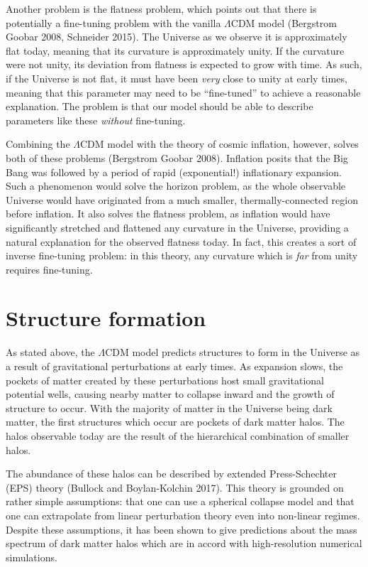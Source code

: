 Another problem is the flatness problem, which points out that there is
potentially a fine-tuning problem with the vanilla \(\Lambda\)CDM model
(Bergstrom Goobar 2008, Schneider 2015). The Universe as we observe it
is approximately flat today, meaning that its curvature is approximately
unity. If the curvature were not unity, its deviation from flatness is
expected to grow with time. As such, if the Universe is not flat, it
must have been \emph{very} close to unity at early times, meaning that
this parameter may need to be ``fine-tuned'' to achieve a reasonable
explanation. The problem is that our model should be able to describe
parameters like these \emph{without} fine-tuning.

Combining the \(\Lambda\)CDM model with the theory of cosmic inflation,
however, solves both of these problems (Bergstrom Goobar 2008).
Inflation posits that the Big Bang was followed by a period of rapid
(exponential!) inflationary expansion. Such a phenomenon would solve the
horizon problem, as the whole observable Universe would have originated
from a much smaller, thermally-connected region before inflation. It
also solves the flatness problem, as inflation would have significantly
stretched and flattened any curvature in the Universe, providing a
natural explanation for the observed flatness today. In fact, this
creates a sort of inverse fine-tuning problem: in this theory, any
curvature which is \emph{far} from unity requires fine-tuning.

\hypertarget{structure-formation}{%
\section{Structure formation}\label{structure-formation}}

As stated above, the \(\Lambda\)CDM model predicts structures to form in
the Universe as a result of gravitational perturbations at early times.
As expansion slows, the pockets of matter created by these perturbations
host small gravitational potential wells, causing nearby matter to
collapse inward and the growth of structure to occur. With the majority
of matter in the Universe being dark matter, the first structures which
occur are pockets of dark matter halos. The halos observable today are
the result of the hierarchical combination of smaller halos.

The abundance of these halos can be described by extended
Press-Schechter (EPS) theory (Bullock and Boylan-Kolchin 2017). This
theory is grounded on rather simple assumptions: that one can use a
spherical collapse model and that one can extrapolate from linear
perturbation theory even into non-linear regimes. Despite these
assumptions, it has been shown to give predictions about the mass
spectrum of dark matter halos which are in accord with high-resolution
numerical simulations.

